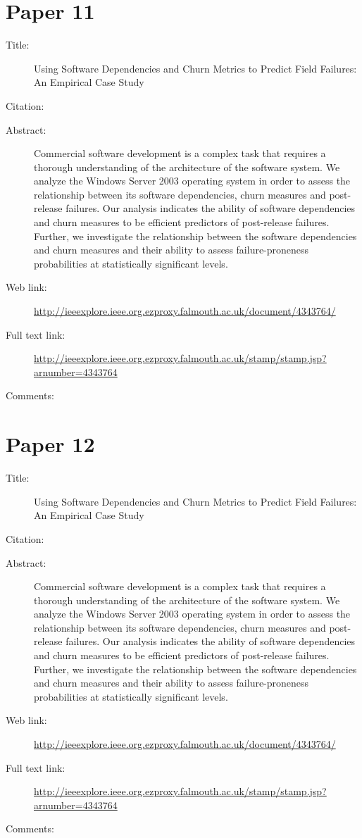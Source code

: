 \documentclass{scrartcl}
\begin{document}
\section*{Paper 11}
\begin{description}
\item[Title:] Using Software Dependencies and Churn Metrics to Predict Field Failures: An Empirical Case Study
\item[Citation:] \cite{nagappan2007using}
\item[Abstract:] Commercial software development is a complex task that requires a thorough understanding of the architecture of the software system. We analyze the Windows Server 2003 operating system in order to assess the relationship between its software dependencies, churn measures and post-release failures. Our analysis indicates the ability of software dependencies and churn measures to be efficient predictors of post-release failures. Further, we investigate the relationship between the software dependencies and churn measures and their ability to assess failure-proneness probabilities at statistically significant levels.
\item[Web link:]\url  {http://ieeexplore.ieee.org.ezproxy.falmouth.ac.uk/document/4343764/}
\item[Full text link:]\url  {http://ieeexplore.ieee.org.ezproxy.falmouth.ac.uk/stamp/stamp.jsp?arnumber=4343764}
\item[Comments:] 
\end{description}
\section*{Paper 12}
\begin{description}
\item[Title:] Using Software Dependencies and Churn Metrics to Predict Field Failures: An Empirical Case Study
\item[Citation:] \cite{nagappan2007using}
\item[Abstract:] Commercial software development is a complex task that requires a thorough understanding of the architecture of the software system. We analyze the Windows Server 2003 operating system in order to assess the relationship between its software dependencies, churn measures and post-release failures. Our analysis indicates the ability of software dependencies and churn measures to be efficient predictors of post-release failures. Further, we investigate the relationship between the software dependencies and churn measures and their ability to assess failure-proneness probabilities at statistically significant levels.
\item[Web link:]\url  {http://ieeexplore.ieee.org.ezproxy.falmouth.ac.uk/document/4343764/}
\item[Full text link:]\url  {http://ieeexplore.ieee.org.ezproxy.falmouth.ac.uk/stamp/stamp.jsp?arnumber=4343764}
\item[Comments:] 
\end{description}



\end{document}
